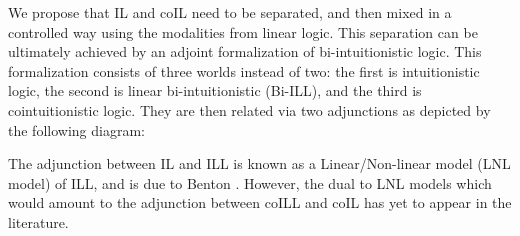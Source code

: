 We propose that IL and coIL need to be separated, and then mixed in a
controlled way using the modalities from linear logic.  This
separation can be ultimately achieved by an adjoint formalization of
bi-intuitionistic logic.  This formalization consists of three worlds
instead of two: the first is intuitionistic logic, the second is
linear bi-intuitionistic (Bi-ILL), and the third is cointuitionistic
logic.  They are then related via two adjunctions as depicted by the
following diagram:
\begin{center}
    
\end{center}
The adjunction between IL and ILL is known as a Linear/Non-linear model
(LNL model) of ILL, and is due to Benton \cite{Benton:1994}.  However,
the dual to LNL models which would amount to the adjunction between coILL
and coIL has yet to appear in the literature.

